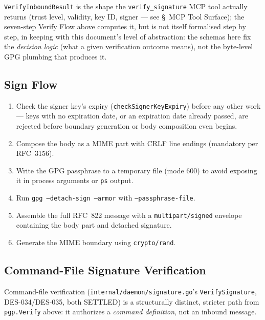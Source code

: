 \documentclass[a4paper,10pt,fleqn]{article}
\begin{document}
\texttt{VerifyInboundResult} is the shape the \texttt{verify\_signature}
MCP tool actually returns (trust level, validity, key ID, signer ---
see \S~MCP Tool Surface); the seven-step Verify Flow above computes
it, but is not itself formalised step by step, in keeping with this
document's level of abstraction: the schemas here fix the
\emph{decision logic} (what a given verification outcome means), not
the byte-level GPG plumbing that produces it.

\subsection{Sign Flow}

\begin{enumerate}
  \item Check the signer key's expiry (\texttt{checkSignerKeyExpiry})
    before any other work --- keys with no expiration date, or an
    expiration date already passed, are rejected before boundary
    generation or body composition even begins.
  \item Compose the body as a MIME part with CRLF line endings
    (mandatory per RFC~3156).
  \item Write the GPG passphrase to a temporary file (mode 600) to
    avoid exposing it in process arguments or \texttt{ps} output.
  \item Run \texttt{gpg --detach-sign --armor} with
    \texttt{--passphrase-file}.
  \item Assemble the full RFC~822 message with a
    \texttt{multipart/signed} envelope containing the body part and
    detached signature.
  \item Generate the MIME boundary using \texttt{crypto/rand}.
\end{enumerate}

\subsection{Command-File Signature Verification}

Command-file verification (\texttt{internal/daemon/signature.go}'s
\texttt{VerifySignature}, DES-034/DES-035, both SETTLED) is a
structurally distinct, stricter path from \texttt{pgp.Verify} above:
it authorizes a \emph{command definition}, not an inbound message.
\end{document}
